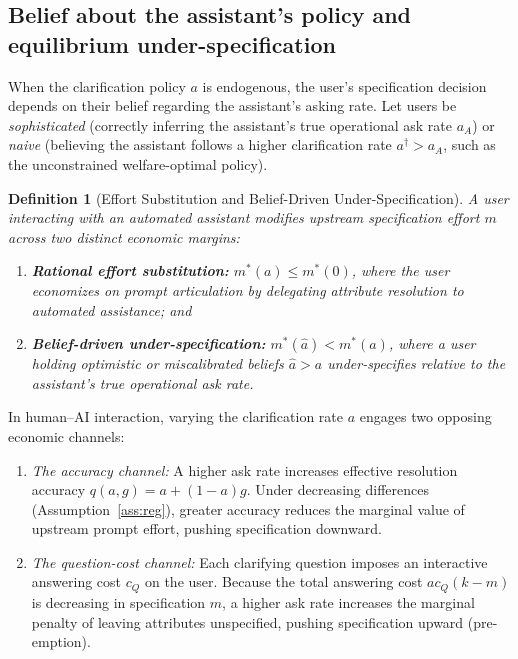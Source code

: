 \documentclass[11pt]{article}
\newtheorem{definition}{Definition}
\begin{document}
\subsection{Belief about the assistant's policy and equilibrium under-specification}
\label{sec:naive-soph}
When the clarification policy $a$ is endogenous, the user's specification decision depends on their belief regarding the assistant's asking rate. Let users be \emph{sophisticated} (correctly inferring the assistant's true operational ask rate $a_A$) or \emph{naive} (believing the assistant follows a higher clarification rate $a^\dagger > a_A$, such as the unconstrained welfare-optimal policy).

\begin{definition}[Effort Substitution and Belief-Driven Under-Specification]
\label{def:underspec}
A user interacting with an automated assistant modifies upstream specification effort $m$ across two distinct economic margins:
\begin{enumerate}[label=(\roman*)]
\item \textbf{Rational effort substitution:} $m^*(a) \le m^*(0)$, where the user economizes on prompt articulation by delegating attribute resolution to automated assistance; and
\item \textbf{Belief-driven under-specification:} $m^*(\hat a) < m^*(a)$, where a user holding optimistic or miscalibrated beliefs $\hat a > a$ under-specifies relative to the assistant's true operational ask rate.
\end{enumerate}
\end{definition}

In human--AI interaction, varying the clarification rate $a$ engages two opposing economic channels:
\begin{enumerate}[leftmargin=*]
\item \emph{The accuracy channel:} A higher ask rate increases effective resolution accuracy $q(a,g) = a + (1-a)g$. Under decreasing differences (Assumption~\ref{ass:reg}), greater accuracy reduces the marginal value of upstream prompt effort, pushing specification downward.
\item \emph{The question-cost channel:} Each clarifying question imposes an interactive answering cost $c_Q$ on the user. Because the total answering cost $a c_Q (k-m)$ is decreasing in specification $m$, a higher ask rate increases the marginal penalty of leaving attributes unspecified, pushing specification upward (pre-emption).
\end{enumerate}
\end{document}
